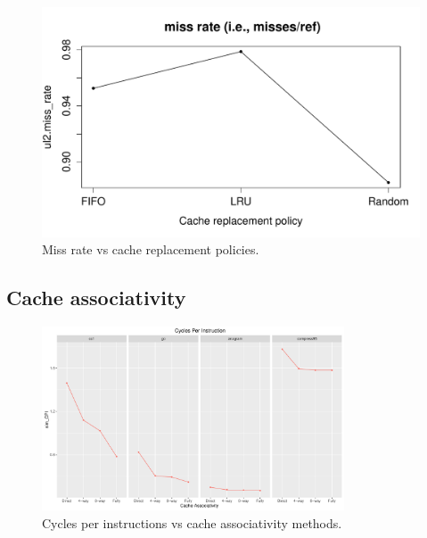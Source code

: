 \documentclass[10pt]{scrartcl}
\begin{document}
\begin{figure}[!htb]
\endminipage
{}%
  \includegraphics[trim={1cm 1.2cm 0 1.8cm},clip,width=\linewidth]{NewPlots/plot_RP_G_miss_rate}
\endminipage
\caption{Miss rate vs cache replacement policies.}\label{fig:cache-rp_miss_rate}
\end{figure}

\FloatBarrier

\subsection{Cache associativity}

\begin{figure}[h]
  \centering
  \includegraphics[width=0.8\textwidth]{Plots/plot_CacheA_sim_CPI}
  \caption{Cycles per instructions vs cache associativity methods.}\label{fig:cache-a_sim_cpi}
\end{figure}
\end{document}
